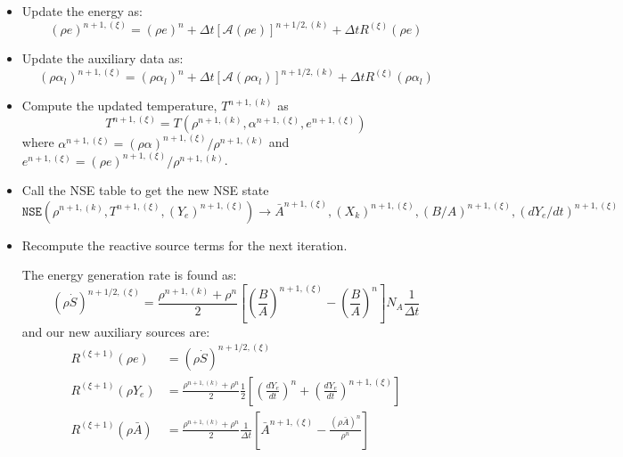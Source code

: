 \documentclass[times,modern]{aastex63}
\newcommand{\Sdot}{\dot{S}}
\newcommand{\Advss}[1]{{\left [{\mathcal{{A}}} \left(#1\right)\right]}}
\newcommand{\nse}[1]{{\mathtt{NSE}( #1 )}}
\begin{document}
\begin{itemize}
\item Update the energy as:
   \begin{equation}
     (\rho e)^{n+1,(\xi)} = (\rho e)^n + \Delta t \Advss{\rho e}^{n+1/2,(k)} + \Delta t R^{(\xi)}(\rho e)
   \end{equation}

\item Update the auxiliary data as:
   \begin{equation}
     (\rho \alpha_l)^{n+1,(\xi)} = (\rho \alpha_l)^n + \Delta t \Advss{\rho \alpha_l}^{n+1/2,(k)} + \Delta t R^{(\xi)}(\rho \alpha_l)
   \end{equation}

\item Compute the updated temperature, $T^{n+1,(k)}$ as
  \begin{equation}
    T^{n+1,(\xi)} = T(\rho^{n+1,(k)},  \alpha^{n+1,(\xi)},  e^{n+1,(\xi)})
  \end{equation}
  where $\alpha^{n+1,(\xi)} = (\rho  \alpha)^{n+1,(\xi)} / \rho^{n+1,(k)}$ and $e^{n+1,(\xi)} = (\rho e)^{n+1,(\xi)} / \rho^{n+1,(k)}$.

\item Call the NSE table to get the new NSE state
  \begin{equation}
    \nse{\rho^{n+1,(k)}, T^{n+1,(\xi)}, (Y_e)^{n+1,(\xi)}} \rightarrow \bar{A}^{n+1,(\xi)}, (X_k)^{n+1,(\xi)}, (B/A)^{n+1,(\xi)}, (dY_e/dt)^{n+1,(\xi)}
  \end{equation}

\item Recompute the reactive source terms for the next iteration.

  The energy generation rate is found as:
  \begin{equation}
    (\rho \Sdot)^{n+1/2,(\xi)} = \frac{\rho^{n+1,(k)} + \rho^n}{2}
    \left [ \left ( \frac{B}{A} \right )^{n+1,(\xi)} -
      \left ( \frac{B}{A} \right )^n \right ] N_A \frac{1}{\Delta t}
  \end{equation}
  and our new auxiliary sources are:
\begin{align}
R^{(\xi+1)}(\rho e) &= (\rho \Sdot)^{n+1/2,(\xi)} \\
R^{(\xi+1)}(\rho Y_e) &= \frac{\rho^{n+1,(k)} + \rho^n}{2} \frac{1}{2} \left [ \left (\frac{dY_e}{dt} \right )^n + \left (\frac{dY_e}{dt} \right )^{n+1,(\xi)} \right ] \\
R^{(\xi+1)}(\rho \bar{A}) &= \frac{\rho^{n+1,(k)} + \rho^n}{2} \frac{1}{\Delta t} \left [ \bar{A}^{n+1,(\xi)} - \frac{(\rho \bar{A})^n}{\rho^n} \right ]
\end{align}

\end{itemize}
\end{document}
